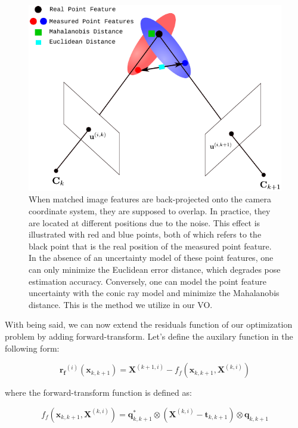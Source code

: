 \documentclass[a4paper]{report}
\numberwithin{figure}{section}
\begin{document}
\begin{figure}[H] \centering
\includegraphics[width=0.9\linewidth,natwidth=640,natheight=640]
{fig/drawings/feature_uncertainty.pdf} \caption[Pose Estimation With Feature
Uncertainty] {When matched image features are back-projected onto the camera
coordinate system, they are supposed to overlap. In practice, they are located
at different positions due to the noise. This effect is illustrated with red
and blue points, both of which refers to the black point that is the real
position of the measured point feature. In the absence of an uncertainty model
of these point features, one can only minimize the Euclidean error distance,
which degrades pose estimation accuracy. Conversely, one can model the point
feature uncertainty with the conic ray model and minimize the Mahalanobis
distance. This is the method we utilize in our VO.} \label{fig:min_mahalanobis}
\end{figure}

With being said, we can now extend the residuals function of our optimization
problem by adding forward-transform.  Let's define the auxilary function in the
following form:

\begin{equation} \mathbf{r_{f}}^{(i)}(\mathbf{x}_{k,k+1}) =
\mathbf{X}^{(k+1,i)} - f_f(\mathbf{x}_{k,k+1}, \mathbf{X}^{(k,i)})
\end{equation}

where the forward-transform function is defined as:

\begin{equation} f_f(\mathbf{x}_{k,k+1}, \mathbf{X}^{(k,i)}) =
\mathbf{q}_{k,k+1}^* \otimes (\mathbf{X}^{(k,i)} - \mathbf{t}_{k,k+1})
\otimes \mathbf{q}_{k,k+1} \end{equation}
\end{document}
